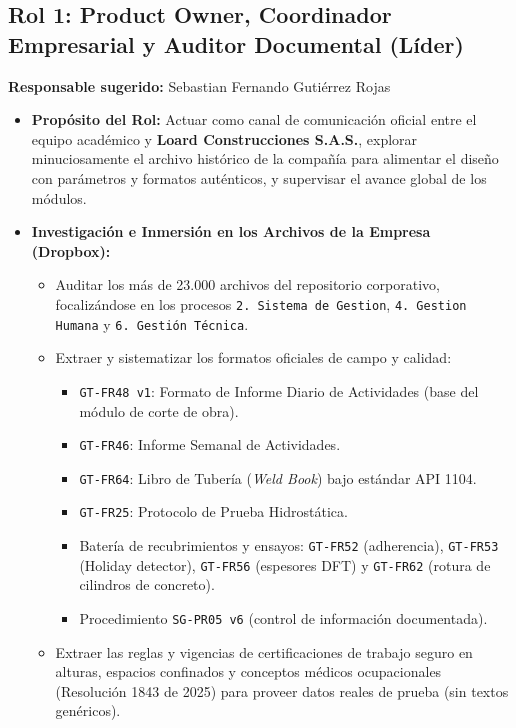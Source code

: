 \documentclass[11pt,letterpaper]{article}
\begin{document}
\subsection{Rol 1: Product Owner, Coordinador Empresarial y Auditor Documental (Líder)}
\textbf{Responsable sugerido:} Sebastian Fernando Gutiérrez Rojas

\begin{itemize}
    \item \textbf{Propósito del Rol:} Actuar como canal de comunicación oficial entre el equipo académico y \textbf{Loard Construcciones S.A.S.}, explorar minuciosamente el archivo histórico de la compañía para alimentar el diseño con parámetros y formatos auténticos, y supervisar el avance global de los módulos.
    \item \textbf{Investigación e Inmersión en los Archivos de la Empresa (Dropbox):}
    \begin{itemize}
        \item Auditar los más de 23.000 archivos del repositorio corporativo, focalizándose en los procesos \texttt{2. Sistema de Gestion}, \texttt{4. Gestion Humana} y \texttt{6. Gestión Técnica}.
        \item Extraer y sistematizar los formatos oficiales de campo y calidad:
        \begin{itemize}
            \item \texttt{GT-FR48 v1}: Formato de Informe Diario de Actividades (base del módulo de corte de obra).
            \item \texttt{GT-FR46}: Informe Semanal de Actividades.
            \item \texttt{GT-FR64}: Libro de Tubería (\emph{Weld Book}) bajo estándar API 1104.
            \item \texttt{GT-FR25}: Protocolo de Prueba Hidrostática.
            \item Batería de recubrimientos y ensayos: \texttt{GT-FR52} (adherencia), \texttt{GT-FR53} (Holiday detector), \texttt{GT-FR56} (espesores DFT) y \texttt{GT-FR62} (rotura de cilindros de concreto).
            \item Procedimiento \texttt{SG-PR05 v6} (control de información documentada).
        \end{itemize}
        \item Extraer las reglas y vigencias de certificaciones de trabajo seguro en alturas, espacios confinados y conceptos médicos ocupacionales (Resolución 1843 de 2025) para proveer datos reales de prueba (sin textos genéricos).

\end{itemize}
\end{itemize}
\end{document}
